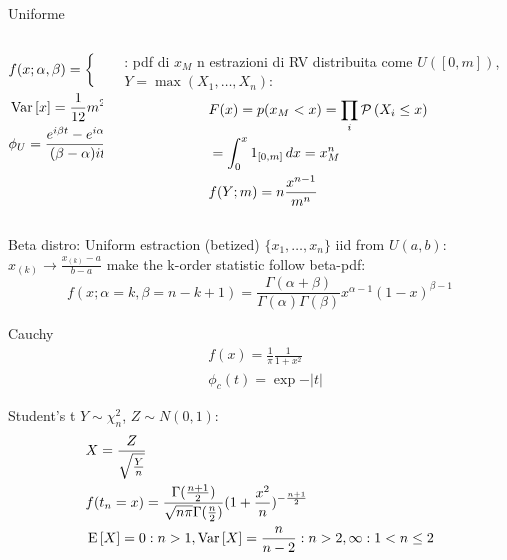 \documentclass[asd-beamer.tex]{subfiles}
\begin{document}
\begin{frame}{Uniforme}
\begin{columns}[T]
	\begin{column}{0.5\textwidth}
	\begin{align*}
	&f(x;\alpha,\beta)=\left\{\begin{array}{c}\frac{1}{\beta-\alpha}\\0\\
	\end{array}\right.\\
	&\operatorname{Var}{[x]}=\frac{1}{12}m^2\\
	&\phi_U=\frac{e^{i\beta t}-e^{i\alpha t}}{(\beta-\alpha)it}
	\end{align*}
	\end{column}
	\begin{column}{0.5\textwidth}
	\begin{block}{: pdf di $x_M$}
		n estrazioni di RV distribuita come $U([0,m])$, $Y=\max{(X_1,\ldots,X_n)}$:
		\begin{align*}
		&F(x)=p(x_M<x)=\prod_i\operatorname{\mathcal{P}}{(X_i\leq x)}\\
		&=\int_0^x1_{[0,m]}\,dx=x_M^n\\
		&f(Y;m)=n\frac{x^{n-1}}{m^n}
		\end{align*}
	\end{block}
\end{column}
\end{columns}
\end{frame}

\begin{frame}{Beta distro: Uniform estraction (betized)}
$\{x_1,\ldots,x_n\}$ iid from $U(a,b)$: $x_{(k)}\to\frac{x_{(k)}-a}{b-a}$ make the k-order statistic follow beta-pdf:
\[f(x;\alpha=k,\beta=n-k+1)=\frac{\Gamma(\alpha+\beta)}{\Gamma(\alpha)\Gamma(\beta)}x^{\alpha-1}(1-x)^{\beta-1}\]
\end{frame}

\begin{frame}{Cauchy}
\begin{align*}
&f(x)=\frac{1}{\pi}\frac{1}{1+x^2}\\
&\phi_c(t)=\exp{-|t|}
\end{align*}
\end{frame}

\begin{frame}{Student's t}
$Y\sim\chi^2_n$, $Z\sim N(0,1)$:
\begin{align*}
&X=\frac{Z}{\sqrt{\frac{Y}{n}}}\\
&f(t_n=x)=\frac{\Gamma(\frac{n+1}{2})}{\sqrt{n\pi}\Gamma(\frac{n}{2})}(1+\frac{x^2}{n})^{-\frac{n+1}{2}}\\
&\operatorname{E}{[X]}=0: n>1, \operatorname{Var}{[X]}=\frac{n}{n-2}: n>2, \infty: 1<n\leq2
\end{align*}
\end{frame}
\end{document}
